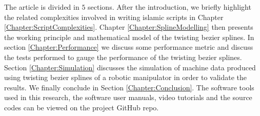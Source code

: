 {    The article is divided in $5$ sections. After the introduction, we briefly highlight the related complexities involved in writing islamic scripts in Chapter \ref{Chapter:ScriptComplexities}. Chapter \ref{Chapter:SplineModelling} then presents the working principle and mathematical model of the twisting bezier splines. In section \ref{Chapter:Performance} we discuss some performance metric and discuss the tests performed to gauge the performance of the twisting bezier splines. Section \ref{Chapter:Simulation} discusses the simulation of machine data produced using twisting bezier splines of a robotic manipulator in order to validate the results. We finally conclude in Section \ref{Chapter:Conclusion}. The software tools used in this research, the software user manuals, video tutorials and the source codes can be viewed on the project GitHub repo\cite{bib20}.
}
